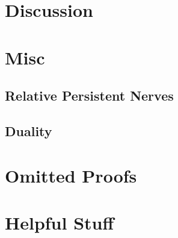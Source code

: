 \documentclass[12pt]{article}
\begin{document}
\clearpage
\section{Discussion}
  




\clearpage
\appendix
\section{Misc}\label{apx:misc}
\subsection{Relative Persistent Nerves}\label{apx:nerves}


\subsection{Duality}\label{apx:duality}


\section{Omitted Proofs}\label{apx:omit}
\printproofs

\section{Helpful Stuff}

\end{document}
